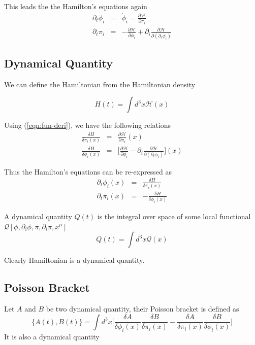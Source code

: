 \documentclass[12pt]{book}
\begin{document}
	This leads the the Hamilton's equations	again
	\begin{eqnarray}
		\partial_t\phi_i&=&\dot\phi_i=\frac{\partial\mathcal{H}}{\partial\pi_i}\\
		\partial_t\pi_i&=&-\frac{\partial\mathcal{H}}{\partial\phi_i}+\partial_i\frac{\partial\mathcal{H}}{\partial(\partial_i\phi_i)}
	\end{eqnarray}
	
	\subsection{Dynamical Quantity}
	
	We can define the Hamiltonian from the Hamiltonian density
	
	\begin{equation}
		H(t)=\int d^3x\mathcal{H}(x)
	\end{equation}
	
	Using (\ref{eqn:fun-deri}), we have the following relations	
	\begin{eqnarray}
		\frac{\delta H}{\delta\pi_i(x)}&=&\frac{\partial\mathcal{H}}{\partial\pi_i}(x)\\
		\frac{\delta H}{\delta\phi_i(x)}&=&\Big[\frac{\partial\mathcal{H}}{\partial\phi_i}-\partial_i\frac{\partial\mathcal{H}}{\partial(\partial_i\phi_i)}\Big](x)
	\end{eqnarray}
	
	Thus the Hamilton's equations can be re-expressed as 	
	\begin{eqnarray}
		\partial_t\phi_i(x)&=&\frac{\delta H}{\delta\pi_i(x)}\\
		\partial_t\pi_i(x)&=&-\frac{\delta H}{\delta\phi_i(x)}
	\end{eqnarray}
	
	A dynamical quantity $Q(t)$ is the integral over space of some local functional $\mathcal{Q}[\phi,\partial_i\phi,\pi,\partial_i\pi,x^\mu]$
	\begin{equation}
		Q(t)=\int d^3x\mathcal{Q}(x)
	\end{equation}
	
	Clearly Hamiltonian is a dynamical quantity.
	
	\subsection{Poisson Bracket}
	
	Let $A$ and $B$ be two dynamical quantity, their Poisson bracket is defined as	
	\begin{equation}
		\{A(t),B(t)\}=\int d^3x\Big[\frac{\delta A}{\delta \phi_i(x)}\frac{\delta B}{\delta \pi_i(x)}-\frac{\delta A}{\delta \pi_i(x)}\frac{\delta B}{\delta \phi_i(x)}\Big]
	\end{equation}
	It is also a dynamical quantity
	
\end{document}
